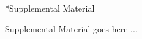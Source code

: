 \documentclass[12pt]{article}
\date{}
\makeatletter
\renewcommand\section{\@startsection
	{subsection}{2}{0mm}
	{-0.2in}
	{0.05\baselineskip}
	{\normalfont\large\bfseries}}
\makeatother
\begin{document}
\section*{Supplemental Material}

Supplemental Material goes here ...




\newpage


\end{document}
